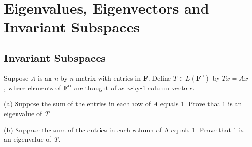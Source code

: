 \chapter{Eigenvalues, Eigenvectors and Invariant Subspaces}

\section{Invariant Subspaces}

\begin{exercise}{24}
Suppose \textit{A} is an \textit{n}-by-\textit{n} matrix with entries in \textbf{F}. Define $ T \in L(\mathbf{F^{n}}) $ by $ T x = A x$, where elements of $\mathbf{F^{n}}$ are thought of as \textit{n}-by-1 column vectors.

(a) Suppose the sum of the entries in each row of \textit{A} equals 1. Prove that 1 is an eigenvalue of \textit{T}.

(b) Suppose the sum of the entries in each column of A equals 1. Prove that 1 is an eigenvalue of \textit{T}.
\end{exercise}

